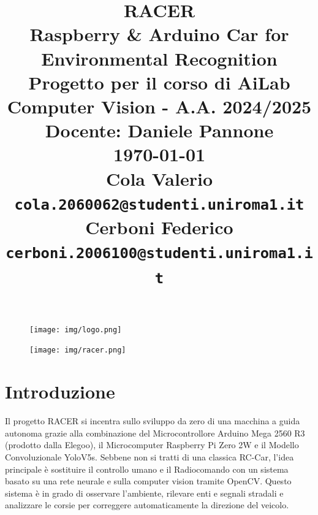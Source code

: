 \documentclass{article}
\begin{document}
\begin{figure}
    \texttt{[image: img/logo.png]}
\end{figure}

\title{
  \textbf{RACER} \\
  \Large\textbf{Raspberry \& Arduino Car for Environmental Recognition} \\
  \vspace{1cm}
  \large{Progetto per il corso di AiLab Computer Vision - A.A. 2024/2025} \\
  \vspace{0.5cm}
  \large{Docente: Daniele Pannone} \\
  \vspace{0.5cm}
  \large \today\\[24pt]
    
  \large{Cola Valerio \texttt{cola.2060062@studenti.uniroma1.it}}\\
  \large{Cerboni Federico \texttt{cerboni.2006100@studenti.uniroma1.it}} 
}

\date{}
\maketitle

\begin{figure}[h!]
    \centering
    \texttt{[image: img/racer.png]}
\end{figure}


\newpage    

\tableofcontents

\newpage    

\section{Introduzione}
    Il progetto RACER si incentra sullo sviluppo da zero di una macchina a guida autonoma grazie alla combinazione del Microcontrollore \cite{arduinomega}
    Arduino Mega 2560 R3 (prodotto dalla Elegoo), il Microcomputer \cite{pizero} Raspberry Pi Zero 2W e il Modello Convoluzionale \cite{yolo} YoloV5s. 
    Sebbene non si tratti di una classica RC-Car, l'idea principale è sostituire il controllo umano e il Radiocomando con un sistema basato su una rete neurale e sulla computer vision tramite OpenCV. Questo sistema è in grado di osservare l'ambiente, rilevare enti e segnali stradali e analizzare le corsie per correggere automaticamente la direzione del veicolo.
\end{document}
